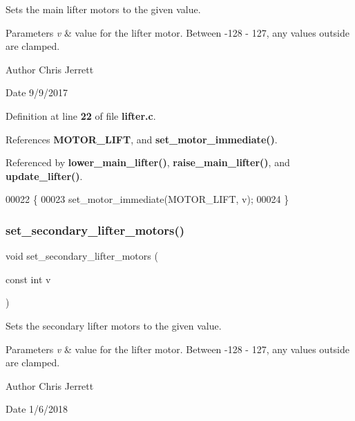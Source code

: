Sets the main lifter motors to the given value. 


\begin{DoxyParams}{Parameters}
{\em v} & value for the lifter motor. Between -\/128 -\/ 127, any values outside are clamped. \\
\hline
\end{DoxyParams}
\begin{DoxyAuthor}{Author}
Chris Jerrett 
\end{DoxyAuthor}
\begin{DoxyDate}{Date}
9/9/2017 
\end{DoxyDate}


Definition at line \textbf{ 22} of file \textbf{ lifter.\+c}.



References \textbf{ M\+O\+T\+O\+R\+\_\+\+L\+I\+FT}, and \textbf{ set\+\_\+motor\+\_\+immediate()}.



Referenced by \textbf{ lower\+\_\+main\+\_\+lifter()}, \textbf{ raise\+\_\+main\+\_\+lifter()}, and \textbf{ update\+\_\+lifter()}.


\begin{DoxyCode}
00022                                          \{
00023   set_motor_immediate(MOTOR_LIFT, v);
00024 \}
\end{DoxyCode}
\mbox{\label{lifter_8h_a78640d547d9361951a92d0bc00939536}} 
\subsubsection{set\+\_\+secondary\+\_\+lifter\+\_\+motors()}
{\footnotesize\ttfamily void set\+\_\+secondary\+\_\+lifter\+\_\+motors (\begin{DoxyParamCaption}\item[{const int}]{v }\end{DoxyParamCaption})}



Sets the secondary lifter motors to the given value. 


\begin{DoxyParams}{Parameters}
{\em v} & value for the lifter motor. Between -\/128 -\/ 127, any values outside are clamped. \\
\hline
\end{DoxyParams}
\begin{DoxyAuthor}{Author}
Chris Jerrett 
\end{DoxyAuthor}
\begin{DoxyDate}{Date}
1/6/2018 
\end{DoxyDate}



